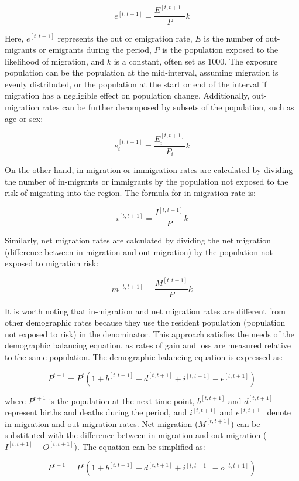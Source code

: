 \documentclass[
]{book}
\begin{document}
\[ e^{[t, t+1]} = \frac{E^{[t, t+1]}}{P}k \]

Here, \(e^{[t, t+1]}\) represents the out or emigration rate, \(E\) is the number of out-migrants or emigrants during the period, \(P\) is the population exposed to the likelihood of migration, and \(k\) is a constant, often set as 1000. The exposure population can be the population at the mid-interval, assuming migration is evenly distributed, or the population at the start or end of the interval if migration has a negligible effect on population change. Additionally, out-migration rates can be further decomposed by subsets of the population, such as age or sex:

\[ e^{[t, t+1]}_i = \frac{E^{[t, t+1]}_i}{P_i}k \]

On the other hand, in-migration or immigration rates are calculated by dividing the number of in-migrants or immigrants by the population not exposed to the risk of migrating into the region. The formula for in-migration rate is:

\[ i^{[t, t+1]} = \frac{I^{[t, t+1]}}{P}k \]

Similarly, net migration rates are calculated by dividing the net migration (difference between in-migration and out-migration) by the population not exposed to migration risk:

\[ m^{[t, t+1]} = \frac{M^{[t, t+1]}}{P}k \]

It is worth noting that in-migration and net migration rates are different from other demographic rates because they use the resident population (population not exposed to risk) in the denominator. This approach satisfies the needs of the demographic balancing equation, as rates of gain and loss are measured relative to the same population. The demographic balancing equation is expressed as:

\[ P^{t+1} = P^t \left(1 + b^{[t, t+1]} - d^{[t, t+1]} + i^{[t, t+1]} - e^{[t, t+1]} \right) \]

where \(P^{t+1}\) is the population at the next time point, \(b^{[t, t+1]}\) and \(d^{[t, t+1]}\) represent births and deaths during the period, and \(i^{[t, t+1]}\) and \(e^{[t, t+1]}\) denote in-migration and out-migration rates. Net migration (\(M^{[t, t+1]}\)) can be substituted with the difference between in-migration and out-migration (\(I^{[t, t+1]} - O^{[t, t+1]}\)). The equation can be simplified as:

\[ P^{t+1} = P^t \left(1 + b^{[t, t+1]} - d^{[t, t+1]} + i^{[t, t+1]} - o^{[t, t+1]} \right) \]
\end{document}
